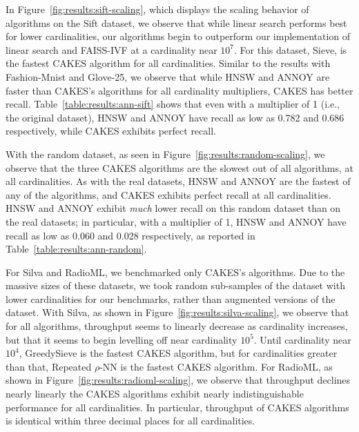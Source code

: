 In Figure~\ref{fig:results:sift-scaling}, which displays the scaling behavior of algorithms on the Sift dataset, we observe that while linear search performs best for lower cardinalities, our algorithms begin to outperform our implementation of linear search and FAISS-IVF at a cardinality near $10^7$.
For this dataset, Sieve, is the fastest CAKES algorithm for all cardinalities.
Similar to the results with Fashion-Mnist and Glove-25, we observe that while HNSW and ANNOY are faster than CAKES's algorithms for all cardinality multipliers, CAKES has better recall.
Table~\ref{table:results:ann-sift} shows that even with a multiplier of 1 (i.e., the original dataset), HNSW and ANNOY have recall as low as 0.782 and 0.686 respectively, while CAKES exhibits perfect recall.


With the random dataset, as seen in Figure~\ref{fig:results:random-scaling}, we observe that the three CAKES algorithms are the slowest out of all algorithms, at all cardinalities. 
As with the real datasets, HNSW and ANNOY are the fastest of any of the algorithms, and CAKES exhibits perfect recall at all cardinalities. 
HNSW and ANNOY exhibit \emph{much} lower recall on this random dataset than on the real datasets; 
in particular, with a multiplier of 1, HNSW and ANNOY have recall as low as 0.060 and 0.028 respectively, as reported in Table~\ref{table:results:ann-random}.


For Silva and RadioML, we benchmarked only CAKES's algorithms.
Due to the massive sizes of these datasets, we took random sub-samples of the dataset with lower cardinalities for our benchmarks, rather than augmented versions of the dataset.
With Silva, as shown in Figure~\ref{fig:results:silva-scaling}, we observe that for all algorithms, throughput seems to linearly decrease as cardinality increases, but that it seems to begin levelling off near cardinality $10^5$. Until cardinality near $10^4$, GreedySieve is the fastest CAKES algorithm, but for cardinalities greater than that, Repeated $\rho$-NN is the fastest CAKES algorithm. 
For RadioML, as shown in Figure~\ref{fig:results:radioml-scaling}, we observe that throughput declines nearly linearly the CAKES algorithms exhibit nearly indistinguishable performance for all cardinalities. In particular, throughput of CAKES algorithms is identical within three decimal places for all cardinalities. 

